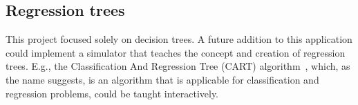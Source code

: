 \subsection{Regression trees}
This project focused solely on decision trees. A future addition to this application could implement a simulator that teaches the concept and creation of regression trees. E.g., the Classification And Regression Tree (CART) algorithm~\cite{cart}, which, as the name suggests, is an algorithm that is applicable for classification and regression problems, could be taught interactively.